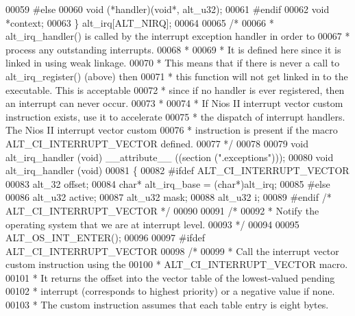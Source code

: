 \begin{DoxyCode}
00059 \textcolor{preprocessor}{#else}
00060   void (*handler)(\textcolor{keywordtype}{void}*, alt_u32);
00061 \textcolor{preprocessor}{#endif}
00062   \textcolor{keywordtype}{void} *context;
00063 \} alt_irq[ALT_NIRQ];
00064 
00065 \textcolor{comment}{/*}
00066 \textcolor{comment}{ * alt\_irq\_handler() is called by the interrupt exception handler in order to }
00067 \textcolor{comment}{ * process any outstanding interrupts. }
00068 \textcolor{comment}{ *}
00069 \textcolor{comment}{ * It is defined here since it is linked in using weak linkage. }
00070 \textcolor{comment}{ * This means that if there is never a call to alt\_irq\_register() (above) then}
00071 \textcolor{comment}{ * this function will not get linked in to the executable. This is acceptable}
00072 \textcolor{comment}{ * since if no handler is ever registered, then an interrupt can never occur.}
00073 \textcolor{comment}{ *}
00074 \textcolor{comment}{ * If Nios II interrupt vector custom instruction exists, use it to accelerate}
00075 \textcolor{comment}{ * the dispatch of interrupt handlers.  The Nios II interrupt vector custom }
00076 \textcolor{comment}{ * instruction is present if the macro ALT\_CI\_INTERRUPT\_VECTOR defined.}
00077 \textcolor{comment}{ */}
00078 
00079 \textcolor{keywordtype}{void} alt_irq_handler (\textcolor{keywordtype}{void}) __attribute__ ((section (".exceptions")));
00080 \textcolor{keywordtype}{void} alt_irq_handler (\textcolor{keywordtype}{void})
00081 \{
00082 \textcolor{preprocessor}{#ifdef ALT\_CI\_INTERRUPT\_VECTOR}
00083   alt_32 offset;
00084   \textcolor{keywordtype}{char}*  alt\_irq\_base = (\textcolor{keywordtype}{char}*)alt_irq;
00085 \textcolor{preprocessor}{#else}
00086   alt_u32 active;
00087   alt_u32 mask;
00088   alt_u32 i;
00089 \textcolor{preprocessor}{#endif }\textcolor{comment}{/* ALT\_CI\_INTERRUPT\_VECTOR */}\textcolor{preprocessor}{}
00090   
00091   \textcolor{comment}{/*}
00092 \textcolor{comment}{   * Notify the operating system that we are at interrupt level.}
00093 \textcolor{comment}{   */} 
00094   
00095   ALT_OS_INT_ENTER();
00096 
00097 \textcolor{preprocessor}{#ifdef ALT\_CI\_INTERRUPT\_VECTOR}
00098   \textcolor{comment}{/*}
00099 \textcolor{comment}{   * Call the interrupt vector custom instruction using the }
00100 \textcolor{comment}{   * ALT\_CI\_INTERRUPT\_VECTOR macro.}
00101 \textcolor{comment}{   * It returns the offset into the vector table of the lowest-valued pending}
00102 \textcolor{comment}{   * interrupt (corresponds to highest priority) or a negative value if none.}
00103 \textcolor{comment}{   * The custom instruction assumes that each table entry is eight bytes.}

\end{DoxyCode}
